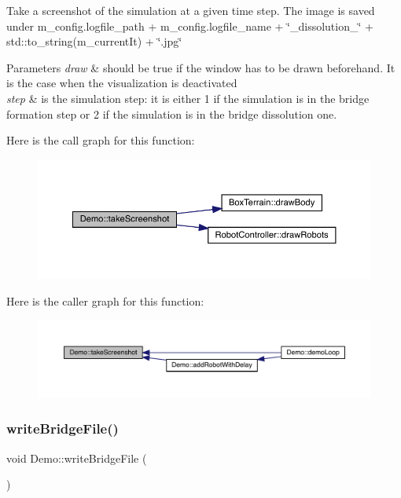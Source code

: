Take a screenshot of the simulation at a given time step. The image is saved under m\+\_\+config.\+logfile\+\_\+path + m\+\_\+config.\+logfile\+\_\+name + \char`\"{}\+\_\+dissolution\+\_\+\char`\"{} + std\+::to\+\_\+string(m\+\_\+current\+It) + \char`\"{}.\+jpg\char`\"{} 
\begin{DoxyParams}{Parameters}
{\em draw} & should be true if the window has to be drawn beforehand. It is the case when the visualization is deactivated \\
\hline
{\em step} & is the simulation step\+: it is either 1 if the simulation is in the bridge formation step or 2 if the simulation is in the bridge dissolution one. \\
\hline
\end{DoxyParams}
Here is the call graph for this function\+:\nopagebreak
\begin{figure}[H]
\begin{center}
\leavevmode
\includegraphics[width=350pt]{class_demo_a8f833d4d73ccdb28cd2e4387fc3bb9e1_cgraph}
\end{center}
\end{figure}
Here is the caller graph for this function\+:\nopagebreak
\begin{figure}[H]
\begin{center}
\leavevmode
\includegraphics[width=350pt]{class_demo_a8f833d4d73ccdb28cd2e4387fc3bb9e1_icgraph}
\end{center}
\end{figure}
\mbox{\label{class_demo_a653b6b835b58959fea0758f2a1695002}} 
\subsubsection{\texorpdfstring{write\+Bridge\+File()}{writeBridgeFile()}}
{\footnotesize\ttfamily void Demo\+::write\+Bridge\+File (\begin{DoxyParamCaption}{ }\end{DoxyParamCaption})}

